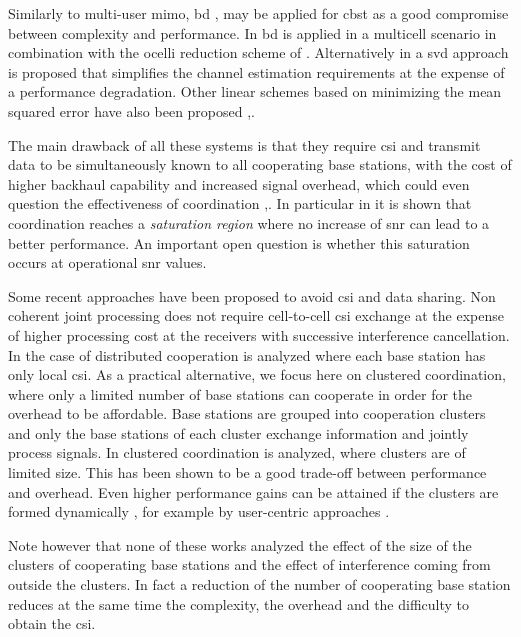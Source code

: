 Similarly to multi-user \gls{mimo}, \gls{bd} \cite{spencer04}, \cite{lim09} may be applied for \gls{cbst} as a good compromise between complexity and performance. In \cite{zhang09} \gls{bd} is applied in a multicell scenario in combination with the \gls{ocelli} reduction scheme of \cite{shim08}. Alternatively in \cite{liu09} a \gls{svd} approach is proposed that simplifies the channel estimation requirements at the expense of a performance degradation. Other linear schemes based on minimizing the mean squared error have also been proposed \cite{armada11a},\cite{shi11}.

The main drawback of all these systems is that they require \gls{csi} and transmit data to be simultaneously known to all cooperating base stations, with the cost of higher backhaul capability and increased signal overhead, which could even question the effectiveness of coordination \cite{lozano13},\cite{barbieri12}. In particular in \cite{lozano13} it is shown that coordination reaches a {\it saturation region} where no increase of \gls{snr} can lead to a better performance. An important open question is whether this saturation occurs at operational \gls{snr} values.

Some recent approaches have been proposed to avoid \gls{csi} and data sharing. Non coherent joint processing \cite{sun11} does not require cell-to-cell \gls{csi} exchange at the expense of higher processing cost at the receivers with successive interference cancellation. In \cite{bjornson10} the case of distributed cooperation is analyzed where each base station has only local \gls{csi}. As a practical alternative, we focus here on clustered coordination, where only a limited number of base stations can cooperate in order for the overhead to be affordable. Base stations are grouped into cooperation clusters and only the base stations of each cluster exchange information and jointly process signals. In \cite{boccardi07a} clustered coordination is analyzed, where clusters are of limited size. This has been shown to be a good trade-off between performance and overhead. Even higher performance gains can be attained if the clusters are formed dynamically \cite{papadogiannis08}, \cite{moon11} for example by user-centric approaches \cite{bjornson11}. 

Note however that none of these works analyzed the effect of the size of the clusters of cooperating base stations and the effect of interference coming from outside the clusters. In fact a reduction of the number of cooperating base station reduces at the same time the complexity, the overhead and the difficulty to obtain the \gls{csi}. 

